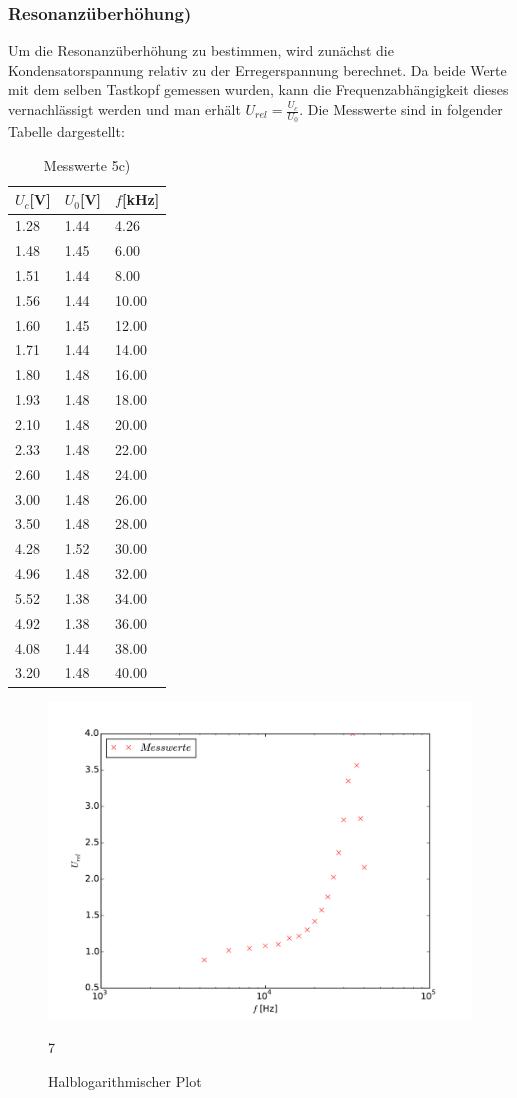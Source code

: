 \subsubsection{Resonanzüberhöhung)}
\label{sec:5c}
Um die Resonanzüberhöhung zu bestimmen, wird zunächst die Kondensatorspannung
relativ zu der Erregerspannung berechnet. Da beide Werte mit dem selben Tastkopf
gemessen wurden, kann die Frequenzabhängigkeit dieses vernachlässigt werden
und man erhält $U_{rel}=\frac{U_c}{U_0}$. Die Messwerte sind in folgender
Tabelle dargestellt:
\begin{table}
\centering
\caption{Messwerte 5c)}
\label{tab:5b}
\begin{tabular}{lll}
\toprule
{$U_c$[V]} & {$U_0$[V]} &{$f$[kHz]}\\
\midrule
1.28 & 1.44 & 4.26 \\
1.48 & 1.45 & 6.00 \\
1.51 & 1.44 & 8.00 \\
1.56 & 1.44 & 10.00 \\
1.60 & 1.45 & 12.00 \\
1.71 & 1.44 & 14.00 \\
1.80 & 1.48 & 16.00 \\
1.93 & 1.48 & 18.00 \\
2.10 & 1.48 & 20.00 \\
2.33 & 1.48 & 22.00 \\
2.60 & 1.48 & 24.00 \\
3.00 & 1.48 & 26.00 \\
3.50 & 1.48 & 28.00 \\
4.28 & 1.52 & 30.00 \\
4.96 & 1.48 & 32.00 \\
5.52 & 1.38 & 34.00 \\
4.92 & 1.38 & 36.00 \\
4.08 & 1.44 & 38.00 \\
3.20 & 1.48 & 40.00 \\
\bottomrule
\end{tabular}
\end{table}
\begin{figure}
  \centering
  \includegraphics[width=\textwidth]{5c.pdf}
  \caption{Halblogarithmischer Plot}7
  \label{fig:5cergebnis}
\end{figure}
